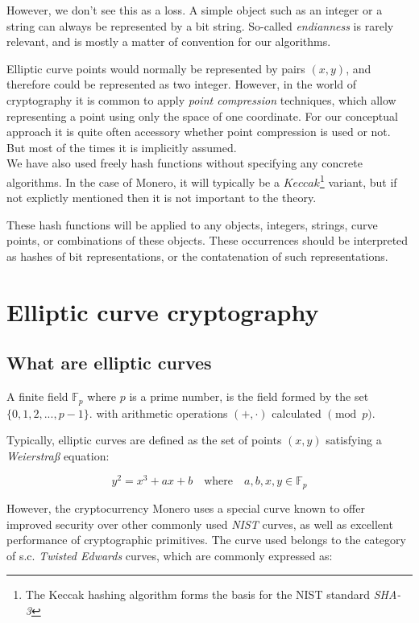 However, we don't see this as a loss.
A simple object such as an integer or a string can always be represented by a bit string. 
So-called {\em endianness} is rarely relevant, and is mostly a matter of convention for our algorithms.

Elliptic curve points would normally be represented by pairs \((x, y)\), and therefore could be represented
as two integer. However, in the world of cryptography it is common to apply {\em point compression} techniques,
which allow representing a point using only the space of one coordinate.
For our conceptual approach it is quite often accessory whether point compression is used or not.
But most of the times it is implicitly assumed. 
\\

We have also used freely hash functions without specifying any concrete algorithms.
In the case of Monero,  it will typically be a \(\mathit{Keccak}\)\footnote{The Keccak hashing algorithm forms the basis
for the NIST standard {\em SHA-3}} 
variant, but if not explictly mentioned then it is not 
important to the theory.

These hash functions will be applied to any objects, integers, strings, curve points, or combinations of
these objects.
These occurrences should be interpreted as hashes of bit representations, or the contatenation of such
representations.




\section{Elliptic curve cryptography}
\label{EllipticCurveCryptography}

\subsection{What are elliptic curves}


A finite field \(\mathbb{F}_p\) where \(p\) is a prime number, is the field formed by the set \(\{0, 1, 2, ..., p-1\}\). with arithmetic operations \((+,  \cdot)\) calculated \( \pmod p\).


Typically, elliptic curves are defined as the set of points \((x, y)\) satisfying a {\em Weierstraß} equation:
 
\[y^2 = x^3 + a x + b \quad \textrm{where} \quad a, b, x, y \in \mathbb{F}_p \]

However, the cryptocurrency Monero uses a special curve known to offer improved security over other commonly used {\em NIST} curves, as well as excellent performance of cryptographic primitives. The curve used belongs to the category of s.c. {\em Twisted Edwards} curves, which are commonly expressed as: 


